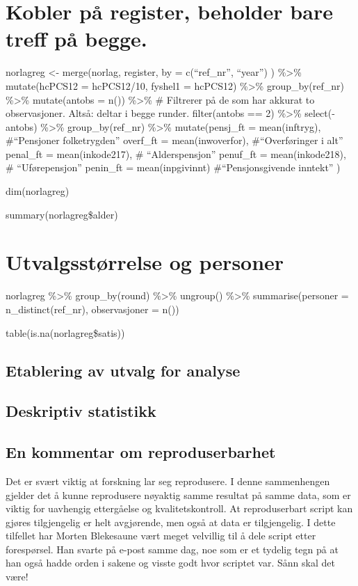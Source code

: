\documentclass[
  norsk,
  letterpaper,
  DIV=11,
  numbers=noendperiod]{scrreprt}
\theoremstyle{definition}
\theoremstyle{remark}
\begin{document}
\chapter{Kobler på register, beholder bare treff på
begge.}\label{kobler-puxe5-register-beholder-bare-treff-puxe5-begge.}

norlagreg \textless- merge(norlag, register, by = c(``ref\_nr'',
``year'') ) \%\textgreater\% mutate(hcPCS12 = hcPCS12/10, fyshel1 =
hcPCS12) \%\textgreater\% group\_by(ref\_nr) \%\textgreater\%
mutate(antobs = n()) \%\textgreater\% \# Filtrerer på de som har akkurat
to observasjoner. Altså: deltar i begge runder. filter(antobs == 2)
\%\textgreater\% select(-antobs) \%\textgreater\% group\_by(ref\_nr)
\%\textgreater\% mutate(pensj\_ft = mean(inftryg), \#``Pensjoner
folketrygden'' overf\_ft = mean(inwoverfor), \#``Overføringer i alt''
penal\_ft = mean(inkode217), \# ``Alderspensjon'' penuf\_ft =
mean(inkode218), \# ``Uførepensjon'' penin\_ft = mean(inpgivinnt)
\#``Pensjonsgivende inntekt'' )

dim(norlagreg)

summary(norlagreg\$alder)

\chapter{Utvalgsstørrelse og
personer}\label{utvalgsstuxf8rrelse-og-personer}

norlagreg \%\textgreater\% group\_by(round) \%\textgreater\% ungroup()
\%\textgreater\% summarise(personer = n\_distinct(ref\_nr),
observasjoner = n())

table(is.na(norlagreg\$satis))

\section{Etablering av utvalg for
analyse}\label{etablering-av-utvalg-for-analyse}

\section{Deskriptiv statistikk}\label{deskriptiv-statistikk-1}

\section{En kommentar om
reproduserbarhet}\label{en-kommentar-om-reproduserbarhet}

Det er svært viktig at forskning lar seg reprodusere. I denne
sammenhengen gjelder det å kunne reprodusere nøyaktig samme resultat på
samme data, som er viktig for uavhengig ettergåelse og
kvalitetskontroll. At reproduserbart script kan gjøres tilgjengelig er
helt avgjørende, men også at data er tilgjengelig. I dette tilfellet har
Morten Blekesaune vært meget velvillig til å dele script etter
forespørsel. Han svarte på e-post samme dag, noe som er et tydelig tegn
på at han også hadde orden i sakene og visste godt hvor scriptet var.
Sånn skal det være!
\end{document}
